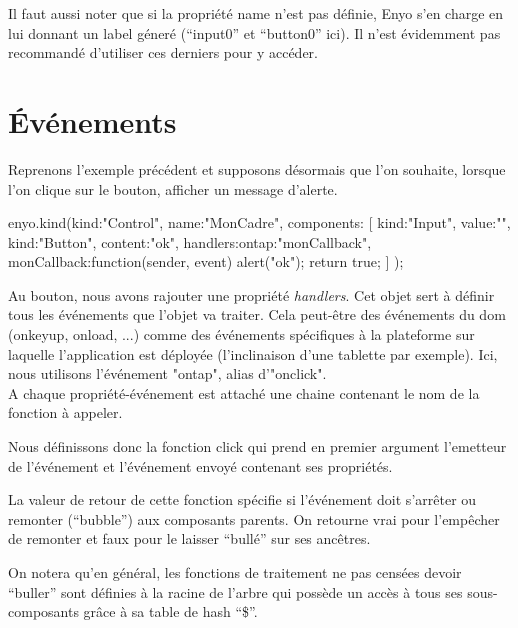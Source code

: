 \documentclass[11pt,a4paper]{report}
\begin{document}
Il faut aussi noter que si la propriété name n'est pas définie, Enyo s'en charge en lui donnant 
un label géneré (``input0'' et ``button0'' ici). Il n'est évidemment pas recommandé 
d'utiliser ces derniers pour y accéder.

\section{\'Evénements}\label{sec:event}

Reprenons l'exemple précédent et supposons désormais que l'on souhaite, lorsque l'on clique sur le bouton, afficher un message d'alerte.

\begin{JavaScript}
enyo.kind({kind:"Control",
           name:"MonCadre",
           components: [
             {kind:"Input", value:""},
             {kind:"Button", content:"ok",
              handlers:{ontap:"monCallback"},
              monCallback:function(sender, event){
                alert("ok");
                return true;
              }
             }
           ]
       	  });
\end{JavaScript}

Au bouton, nous avons rajouter une propriété \emph{handlers}. 
Cet objet sert à définir tous les événements que l'objet va traiter. 
Cela peut-être des événements du dom (onkeyup, onload, ...) comme des événements 
spécifiques à la plateforme sur laquelle l'application est déployée 
(l'inclinaison d'une tablette par exemple). Ici, nous utilisons l'événement "ontap", alias d'"onclick".\\

A chaque propriété-événement est attaché une chaine contenant le nom de la fonction à appeler.

Nous définissons donc la fonction click qui prend en premier argument l'emetteur de 
l'événement et l'événement envoyé contenant ses propriétés.

La valeur de retour de cette fonction spécifie si l'événement doit s'arrêter ou 
remonter (``bubble'') aux composants parents. On retourne vrai pour l'empêcher de 
remonter et faux pour le laisser ``bullé'' sur ses ancêtres.

On notera qu'en général, les fonctions de traitement ne pas censées devoir ``buller'' 
sont définies à la racine de l'arbre qui possède un accès à tous ses sous-composants 
grâce à sa table de hash ``\$''.
\end{document}
